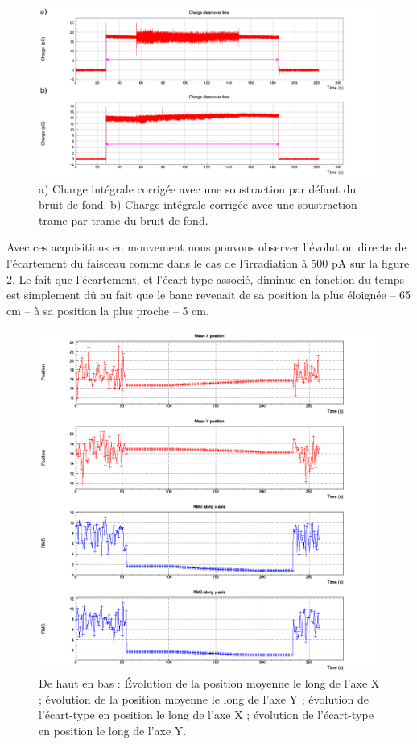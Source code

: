 \documentclass[a4paper,11pt]{article}
\begin{document}
\begin{figure}[h]
\begin{center}
\includegraphics[width=1.\linewidth]{Charge_noclean.png} 
\caption{\label{fig:cclean}\footnotesize{a) Charge intégrale corrigée avec une soustraction par défaut du bruit de fond. b) Charge intégrale corrigée avec une soustraction trame par trame du bruit de fond.}}
\end{center}
\end{figure}

Avec ces acquisitions en mouvement nous pouvons observer l'évolution directe de l'écartement du faisceau comme dans le cas de l'irradiation à 500 pA sur la figure \ref{fig:trav_500pA}.
Le fait que l'écartement, et l'écart-type associé, diminue en fonction du temps est simplement dû au fait que le banc revenait de sa position la plus éloignée -- 65 cm -- à sa position la plus proche -- 5 cm.
\begin{figure}[h]
\begin{center}
\includegraphics[width=1.\linewidth]{Trav_500pA.png} 
\caption{\label{fig:trav_500pA}\footnotesize{De haut en bas : Évolution de la position moyenne le long de l'axe X ; évolution de la position moyenne le long de l'axe Y ; évolution de l'écart-type en position le long de l'axe X ; évolution de l'écart-type en position le long de l'axe Y.}}
\end{center}
\end{figure}
\end{document}
